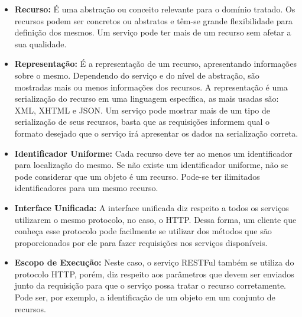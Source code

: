\begin{itemize}
	\item \textbf{Recurso:} É uma abstração ou conceito relevante para o domínio tratado. Os recursos podem ser concretos ou abstratos e têm-se grande flexibilidade para definição dos mesmos. Um serviço pode ter mais de um recurso sem afetar a sua qualidade.
	\item \textbf{Representação:} É a representação de um recurso, apresentando informações sobre o mesmo. Dependendo do serviço e do nível de abstração, são mostradas mais ou menos informações dos recursos. A representação é uma serialização do recurso em uma linguagem específica, as mais usadas são: XML, XHTML e JSON. Um serviço pode mostrar mais de um tipo de serialização de seus recursos, basta que as requisições informem qual o formato desejado que o serviço irá apresentar os dados na serialização correta.
	\item \textbf{Identificador Uniforme:} Cada recurso deve ter ao menos um identificador para localização do mesmo. Se não existe um identificador uniforme, não se pode considerar que um objeto é um recurso. Pode-se ter ilimitados identificadores para um mesmo recurso.
	\item \textbf{Interface Unificada:} A interface unificada diz respeito a todos os serviços utilizarem o mesmo protocolo, no caso, o HTTP. Dessa forma, um cliente que conheça esse protocolo pode facilmente se utilizar dos métodos que são proporcionados por ele para fazer requisições nos serviços disponíveis.
	\item \textbf{Escopo de Execução:} Neste caso, o serviço RESTFul também se utiliza do protocolo HTTP, porém, diz respeito aos parâmetros que devem ser enviados junto da requisição para que o serviço possa tratar o recurso corretamente. Pode ser, por exemplo, a identificação de um objeto em um conjunto de recursos.
\end{itemize}

